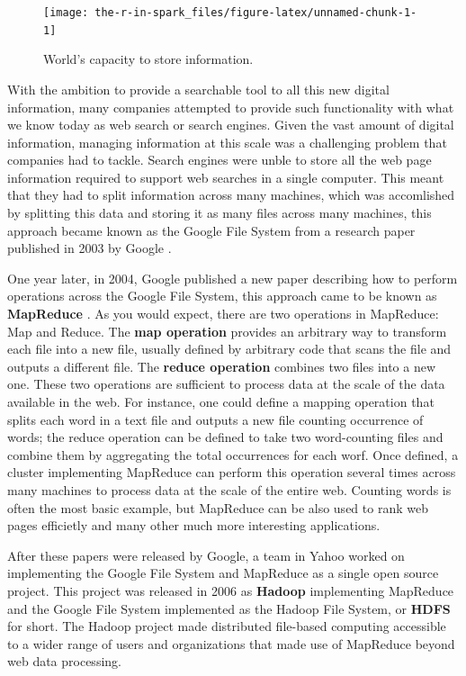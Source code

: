 \documentclass[]{book}
\theoremstyle{definition}
\theoremstyle{definition}
\theoremstyle{definition}
\theoremstyle{remark}
\begin{document}
\begin{figure}

{\centering \texttt{[image: the-r-in-spark\_files/figure-latex/unnamed-chunk-1-1]} 

}

\caption{World’s capacity to store information.}\label{fig:unnamed-chunk-1}
\end{figure}

With the ambition to provide a searchable tool to all this new digital
information, many companies attempted to provide such functionality with
what we know today as web search or search engines. Given the vast
amount of digital information, managing information at this scale was a
challenging problem that companies had to tackle. Search engines were
unble to store all the web page information required to support web
searches in a single computer. This meant that they had to split
information across many machines, which was accomlished by splitting
this data and storing it as many files across many machines, this
approach became known as the Google File System from a research paper
published in 2003 by Google \citep{google-file-system}.

One year later, in 2004, Google published a new paper describing how to
perform operations across the Google File System, this approach came to
be known as \textbf{MapReduce} \citep{google-map-reduce}. As you would
expect, there are two operations in MapReduce: Map and Reduce. The
\textbf{map operation} provides an arbitrary way to transform each file
into a new file, usually defined by arbitrary code that scans the file
and outputs a different file. The \textbf{reduce operation} combines two
files into a new one. These two operations are sufficient to process
data at the scale of the data available in the web. For instance, one
could define a mapping operation that splits each word in a text file
and outputs a new file counting occurrence of words; the reduce
operation can be defined to take two word-counting files and combine
them by aggregating the total occurrences for each worf. Once defined, a
cluster implementing MapReduce can perform this operation several times
across many machines to process data at the scale of the entire web.
Counting words is often the most basic example, but MapReduce can be
also used to rank web pages efficietly and many other much more
interesting applications.

After these papers were released by Google, a team in Yahoo worked on
implementing the Google File System and MapReduce as a single open
source project. This project was released in 2006 as \textbf{Hadoop}
implementing MapReduce and the Google File System implemented as the
Hadoop File System, or \textbf{HDFS} for short. The Hadoop project made
distributed file-based computing accessible to a wider range of users
and organizations that made use of MapReduce beyond web data processing.
\end{document}
